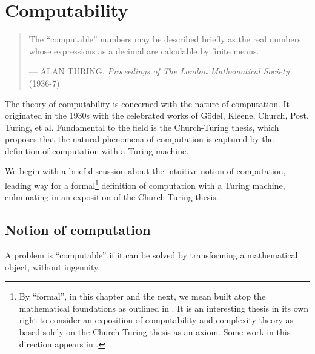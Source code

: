 \chapter{Computability} \label{sec:computability}

\begin{quotation}

\footnotesize\sffamily\itshape

\begin{flushright}

The ``computable'' numbers may be described briefly as the real numbers whose
expressions as a decimal are calculable by finite means.

\smallbreak

\upshape

--- ALAN TURING, {\itshape Proceedings of The London Mathematical Society} (1936-7)

\end{flushright}

\end{quotation}

The theory of computability is concerned with the nature of computation. It
originated in the 1930s with the celebrated works of G\"odel, Kleene, Church,
Post, Turing, et al.  Fundamental to the field is the Church-Turing thesis,
which proposes that the natural phenomena of computation is captured by the
definition of computation with a Turing machine.

We begin with a brief discussion about the intuitive notion of computation,
leading way for a formal\footnote{By ``formal'', in this chapter and the next,
we mean built atop the mathematical foundations as outlined in
. It is an interesting thesis in its
own right to consider an exposition of computability and complexity theory as
based solely on the Church-Turing thesis as an axiom. Some work in this
direction appears in \cite{markov-1954}.} definition of computation with a
Turing machine, culminating in an exposition of the Church-Turing thesis.

\section{Notion of computation}

\begin{notion} A problem is ``computable'' if it can be solved by transforming
a mathematical object, without ingenuity. \end{notion}


